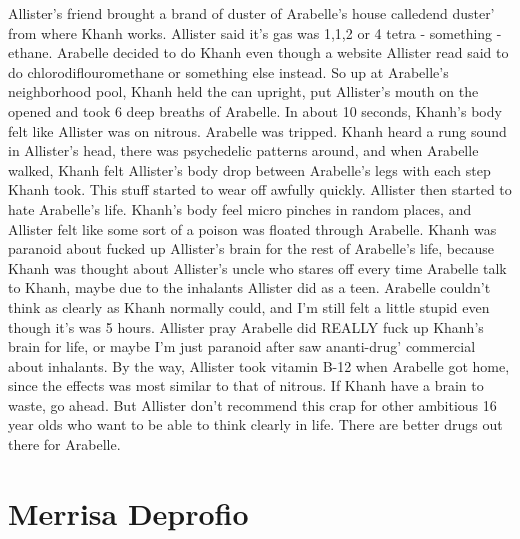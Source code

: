 \documentclass[12pt]{book}
\begin{document}
Allister's friend brought a brand of duster of Arabelle's house calledend duster' from where Khanh works. Allister said it's gas was 1,1,2 or 4 tetra - something - ethane. Arabelle decided to do Khanh even though a website Allister read said to do chlorodiflouromethane or something else instead. So up at Arabelle's neighborhood pool, Khanh held the can upright, put Allister's mouth on the opened and took 6 deep breaths of Arabelle. In about 10 seconds, Khanh's body felt like Allister was on nitrous. Arabelle was tripped. Khanh heard a rung sound in Allister's head, there was psychedelic patterns around, and when Arabelle walked, Khanh felt Allister's body drop between Arabelle's legs with each step Khanh took. This stuff started to wear off awfully quickly. Allister then started to hate Arabelle's life. Khanh's body feel micro pinches in random places, and Allister felt like some sort of a poison was floated through Arabelle. Khanh was paranoid about fucked up Allister's brain for the rest of Arabelle's life, because Khanh was thought about Allister's uncle who stares off every time Arabelle talk to Khanh, maybe due to the inhalants Allister did as a teen. Arabelle couldn't think as clearly as Khanh normally could, and I'm still felt a little stupid even though it's was 5 hours. Allister pray Arabelle did REALLY fuck up Khanh's brain for life, or maybe I'm just paranoid after saw ananti-drug' commercial about inhalants. By the way, Allister took vitamin B-12 when Arabelle got home, since the effects was most similar to that of nitrous. If Khanh have a brain to waste, go ahead. But Allister don't recommend this crap for other ambitious 16 year olds who want to be able to think clearly in life. There are better drugs out there for Arabelle.



\chapter{Merrisa Deprofio}
\end{document}
